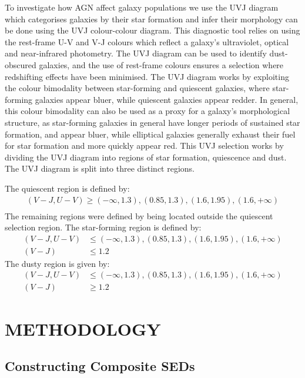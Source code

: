 \documentclass[
  journal=pasa,
  manuscript=research-paper,
  year=202X,
  volume=YY,
]{cup-journal}
\begin{document}
To investigate how AGN affect galaxy populations we use the UVJ diagram which categorises galaxies by their star formation and infer their morphology can be done using the UVJ colour-colour diagram. This diagnostic tool relies on using the rest-frame U-V and V-J colours which reflect a galaxy's ultraviolet, optical and near-infrared photometry. The UVJ diagram can be used to identify dust-obscured galaxies, and the use of rest-frame colours ensures a selection where redshifting effects have been minimised. The UVJ diagram works by exploiting the colour bimodality between star-forming and quiescent galaxies, where star-forming galaxies appear bluer, while quiescent galaxies appear redder. In general, this colour bimodality can also be used as a proxy for a galaxy's morphological structure, as star-forming galaxies in general have longer periods of sustained star formation, and appear bluer, while elliptical galaxies generally exhaust their fuel for star formation and more quickly appear red. This UVJ selection works by dividing the UVJ diagram into regions of star formation, quiescence and dust. The UVJ diagram is split into three distinct regions.

The quiescent region is defined by:
\begin{align*}
    (V - J, U - V) \geq (-\infty, 1.3), (0.85, 1.3), (1.6, 1.95), (1.6, +\infty)\\
\end{align*}
The remaining regions were defined by being located outside the quiescent selection region. The star-forming region is defined by:
\begin{align*}
    (V - J, U - V) &\leq (-\infty, 1.3), (0.85, 1.3), (1.6, 1.95), (1.6, +\infty)\\
    (V - J) &\leq 1.2
\end{align*}
The dusty region is given by:
\begin{align*}
 (V - J, U - V) &\leq (-\infty, 1.3), (0.85, 1.3), (1.6, 1.95), (1.6, +\infty)\\
    (V - J) &\geq 1.2
\end{align*}

\section{METHODOLOGY}
\label{sec:methodology}

\subsection{Constructing Composite SEDs}
\label{subsec:compositeseds}
\end{document}
